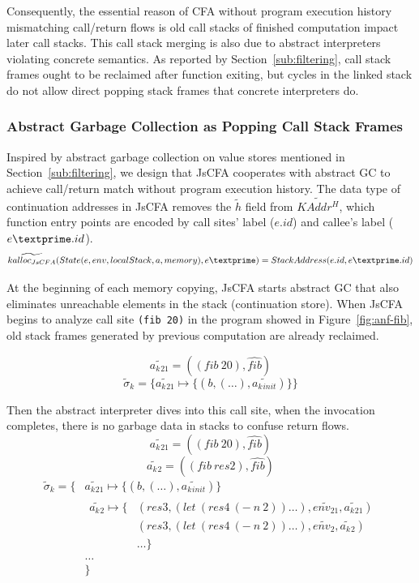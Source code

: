 \documentclass{article}
\begin{document}
Consequently, the essential reason of CFA without program execution history mismatching call/return flows is old call stacks of finished computation impact later call stacks. This call stack merging is also due to abstract interpreters violating concrete semantics. As reported by Section~\ref{sub:filtering}, call stack frames ought to be reclaimed after function exiting, but cycles in the linked stack do not allow direct popping stack frames that concrete interpreters do.

\subsubsection{Abstract Garbage Collection as Popping Call Stack Frames}
\label{subs:stack-gc}
Inspired by abstract garbage collection on value stores mentioned in Section~\ref{sub:filtering}, we design that JsCFA cooperates with abstract GC to achieve call/return match without program execution history. The data type of continuation addresses in JsCFA removes the $\tilde{h}$ field from $\widetilde{KAddr^H}$, which function entry points are encoded by call sites' label ($e.id$) and callee's label ($e\textprime .id$).
\[
\widetilde{kalloc_{JsCFA}}(State(e, env, localStack, a, memory), e\textprime) = StackAddress(e.id, e\textprime .id)
\]

At the beginning of each memory copying, JsCFA starts abstract GC that also eliminates unreachable elements in the stack (continuation store).
When JsCFA begins to analyze call site \verb|(fib 20)| in the program showed in Figure~\ref{fig:anf-fib}, old stack frames generated by previous computation are already reclaimed.

\[
\widetilde{a_k{}_{21}} = ((fib\ 20), \widehat{fib})
\]
\[
\tilde{\sigma}_k = \{\widetilde{a_k{}_{21}} \mapsto \{(b, (\dots), \widetilde{a_k{}_{init}}) \} \}
\]

Then the abstract interpreter dives into this call site, when the invocation completes, there is no garbage data in stacks to confuse return flows.
\[
\widetilde{a_k{}_{21}} = ((fib\ 20), \widehat{fib})
\]
\[
\widetilde{a_k{}_{2}} = ((fib\ res2), \widehat{fib})
\]
\[
\begin{aligned}
\tilde{\sigma}_k = \{
                          {}& \widetilde{a_k{}_{21}} \mapsto \{(b, (\dots), \widetilde{a_k{}_{init}}) \} {}\\
                            &
                            \begin{aligned}
                              \widetilde{a_k{}_{2}} \mapsto
                              \{{}& (res3, (let\ (res4\ (-\ n\ 2)) \dots), \widetilde{env_{21}}, \widetilde{a_k{}_{21}}) {}\\
                              & (res3, (let\ (res4\ (-\ n\ 2)) \dots), \widetilde{env_2}, \widetilde{a_k{}_{2}}) {} \\
                              & \dots
                              \}
                            \end{aligned} {}\\
                            & \dots {}\\
                            & \}
\end{aligned}
\]
\end{document}
